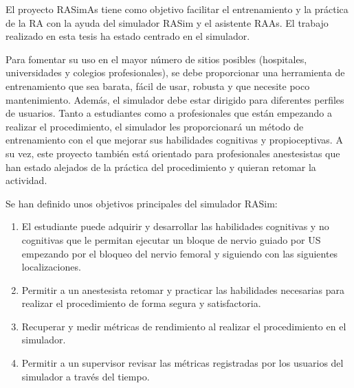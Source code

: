 


El proyecto \ac{RASimAs} tiene como objetivo  facilitar el entrenamiento y la práctica de la \ac{RA} con la ayuda del simulador \ac{RASim} y el asistente \ac{RAAs}. El trabajo realizado en esta tesis ha estado centrado en el simulador.


Para fomentar su uso en el mayor número de sitios posibles (hospitales, universidades y colegios profesionales), se debe proporcionar una herramienta de entrenamiento que sea barata, fácil de usar, robusta y que necesite poco mantenimiento. Además, el simulador debe estar dirigido para diferentes perfiles de usuarios. Tanto a estudiantes como a profesionales que están empezando a realizar el procedimiento, el simulador les proporcionará un método de entrenamiento con el que mejorar sus habilidades cognitivas y propioceptivas. A su vez, este proyecto también está orientado para profesionales anestesistas que han estado alejados de la práctica del procedimiento y quieran retomar la actividad.


Se han definido unos objetivos principales del simulador \ac{RASim}:
\begin{enumerate}
    \item El estudiante puede adquirir y desarrollar las habilidades cognitivas y no cognitivas que le permitan ejecutar un bloque de nervio guiado por \ac{US} empezando por el bloqueo del nervio femoral y siguiendo con las siguientes localizaciones.
    \item Permitir a un anestesista retomar y practicar las habilidades necesarias para realizar el procedimiento de forma segura y satisfactoria.
    \item Recuperar y medir métricas de rendimiento al realizar el procedimiento en el simulador. 
    \item Permitir a un supervisor revisar las métricas registradas por los usuarios del simulador a través del tiempo.
\end{enumerate}



